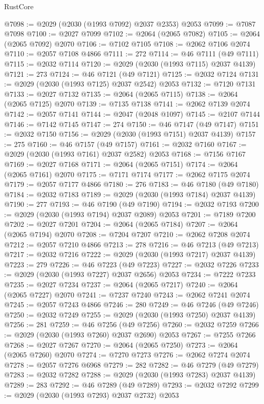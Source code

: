 \begin{lexlean}{RustCore}
\begin{coremodule}
@7098 := @2029 (@2030 (@1993 @7092) @2037 @2353) @2053
@7099 := @7087 @7098
@7100 := @2027 @7099
@7102 := @2064 (@2065 @7082)
@7105 := @2064 (@2065 @7092) @2070
@7106 := @7102 @7105
@7108 := @2062 @7106 @2074
@7110 := @2057 @7108 @4866
@7111 := 272
@7114 := @46 @7111 (@49 @7111)
@7115 := @2032 @7114
@7120 := @2029 (@2030 (@1993 @7115) @2037 @4139)
@7121 := 273
@7124 := @46 @7121 (@49 @7121)
@7125 := @2032 @7124
@7131 := @2029 (@2030 (@1993 @7125) @2037 @2542) @2053
@7132 := @7120 @7131
@7133 := @2027 @7132
@7135 := @2064 (@2065 @7115)
@7138 := @2064 (@2065 @7125) @2070
@7139 := @7135 @7138
@7141 := @2062 @7139 @2074
@7142 := @2057 @7141
@7144 := @2047 (@2048 @1097)
@7145 := @2107 @7144
@7146 := @7142 @7145
@7147 := 274
@7150 := @46 @7147 (@49 @7147)
@7151 := @2032 @7150
@7156 := @2029 (@2030 (@1993 @7151) @2037 @4139)
@7157 := 275
@7160 := @46 @7157 (@49 @7157)
@7161 := @2032 @7160
@7167 := @2029 (@2030 (@1993 @7161) @2037 @2582) @2053
@7168 := @7156 @7167
@7169 := @2027 @7168
@7171 := @2064 (@2065 @7151)
@7174 := @2064 (@2065 @7161) @2070
@7175 := @7171 @7174
@7177 := @2062 @7175 @2074
@7179 := @2057 @7177 @4866
@7180 := 276
@7183 := @46 @7180 (@49 @7180)
@7184 := @2032 @7183
@7189 := @2029 (@2030 (@1993 @7184) @2037 @4139)
@7190 := 277
@7193 := @46 @7190 (@49 @7190)
@7194 := @2032 @7193
@7200 := @2029 (@2030 (@1993 @7194) @2037 @2089) @2053
@7201 := @7189 @7200
@7202 := @2027 @7201
@7204 := @2064 (@2065 @7184)
@7207 := @2064 (@2065 @7194) @2070
@7208 := @7204 @7207
@7210 := @2062 @7208 @2074
@7212 := @2057 @7210 @4866
@7213 := 278
@7216 := @46 @7213 (@49 @7213)
@7217 := @2032 @7216
@7222 := @2029 (@2030 (@1993 @7217) @2037 @4139)
@7223 := 279
@7226 := @46 @7223 (@49 @7223)
@7227 := @2032 @7226
@7233 := @2029 (@2030 (@1993 @7227) @2037 @2656) @2053
@7234 := @7222 @7233
@7235 := @2027 @7234
@7237 := @2064 (@2065 @7217)
@7240 := @2064 (@2065 @7227) @2070
@7241 := @7237 @7240
@7243 := @2062 @7241 @2074
@7245 := @2057 @7243 @4866
@7246 := 280
@7249 := @46 @7246 (@49 @7246)
@7250 := @2032 @7249
@7255 := @2029 (@2030 (@1993 @7250) @2037 @4139)
@7256 := 281
@7259 := @46 @7256 (@49 @7256)
@7260 := @2032 @7259
@7266 := @2029 (@2030 (@1993 @7260) @2037 @2690) @2053
@7267 := @7255 @7266
@7268 := @2027 @7267
@7270 := @2064 (@2065 @7250)
@7273 := @2064 (@2065 @7260) @2070
@7274 := @7270 @7273
@7276 := @2062 @7274 @2074
@7278 := @2057 @7276 @6968
@7279 := 282
@7282 := @46 @7279 (@49 @7279)
@7283 := @2032 @7282
@7288 := @2029 (@2030 (@1993 @7283) @2037 @4139)
@7289 := 283
@7292 := @46 @7289 (@49 @7289)
@7293 := @2032 @7292
@7299 := @2029 (@2030 (@1993 @7293) @2037 @2732) @2053

\end{coremodule}
\end{lexlean}
